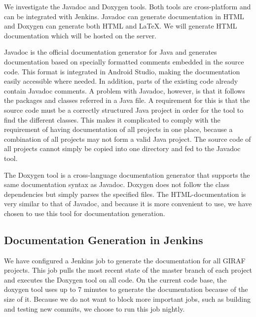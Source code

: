 We investigate the Javadoc \parencite{javadoc} and Doxygen \parencite{doxygen} tools. Both tools are cross-platform and can be integrated with Jenkins. Javadoc can generate documentation in HTML and Doxygen can generate both HTML and \LaTeX. We will generate HTML documentation which will be hosted on the server.

Javadoc is the official documentation generator for Java and generates documentation based on specially formatted comments embedded in the source code. This format is integrated in Android Studio, making the documentation easily accessible where needed. In addition, parts of the existing code already contain Javadoc comments. A problem with Javadoc, however, is that it follows the packages and classes referred in a Java file. A requirement for this is that the source code must be a correctly structured Java project in order for the tool to find the different classes. This makes it complicated to comply with the requirement of having documentation of all projects in one place, because a combination of all projects may not form a valid Java project. The source code of all projects cannot simply be copied into one directory and fed to the Javadoc tool.

The Doxygen tool is a cross-language documentation generator that supports the same documentation syntax as Javadoc. Doxygen does not follow the class dependencies but simply parses the specified files. The HTML-documentation is very similar to that of Javadoc, and because it is more convenient to use, we have chosen to use this tool for documentation generation.

\subsection{Documentation Generation in Jenkins}
We have configured a Jenkins job to generate the documentation for all GIRAF projects. This job pulls the most recent state of the master branch of each project and executes the Doxygen tool on all code. On the current code base, the doxygen tool uses up to 7 minutes to generate the documentation because of the size of it. Because we do not want to block more important jobs, such as building and testing new commits, we choose to run this job nightly.